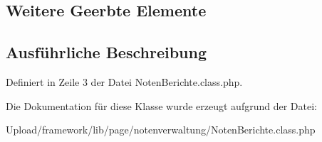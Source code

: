 \subsection*{Weitere Geerbte Elemente}


\subsection{Ausführliche Beschreibung}


Definiert in Zeile 3 der Datei Noten\+Berichte.\+class.\+php.



Die Dokumentation für diese Klasse wurde erzeugt aufgrund der Datei\+:\begin{DoxyCompactItemize}
\item 
Upload/framework/lib/page/notenverwaltung/Noten\+Berichte.\+class.\+php\end{DoxyCompactItemize}
